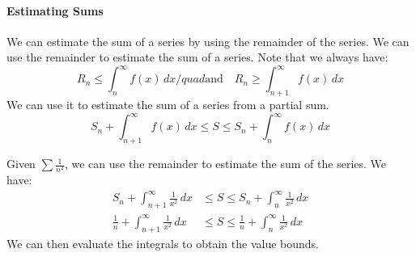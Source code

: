 \documentclass[11pt]{report}
\begin{document}
\paragraph{Estimating Sums} We can estimate the sum of a series by using the remainder of the series. We can use the remainder to estimate the sum of a series. Note that we always have:
\begin{equation}
    R_n \le \int_n^{\infty} f(x) \, dx /quad \text{and} \quad R_n \ge \int_{n+1}^{\infty} f(x) \, dx
\end{equation}
We can use it to estimate the sum of a series from a partial sum.
\begin{equation}
    S_n + \int_{n+1}^{\infty} f(x) \, dx \le S \le S_n + \int_n^{\infty} f(x) \, dx
\end{equation}
\begin{example}
    Given $\sum \frac{1}{n^2}$, we can use the remainder to estimate the sum of the series. We have:
    \begin{align*}
        S_n + \int_{n+1}^{\infty} \frac{1}{x^2} \, dx &\le S \le S_n + \int_n^{\infty} \frac{1}{x^2} \, dx \\
        \frac{1}{n} + \int_{n+1}^{\infty} \frac{1}{x^2} \, dx &\le S \le \frac{1}{n} + \int_n^{\infty} \frac{1}{x^2} \, dx
    \end{align*}
    We can then evaluate the integrals to obtain the value bounds.
\end{example}
\end{document}
